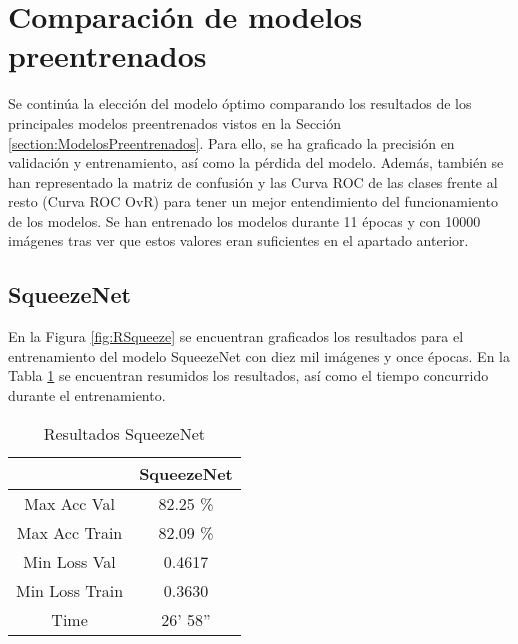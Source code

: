 \documentclass{report}
\begin{document}
\newpage
\section{Comparación de modelos preentrenados}



Se continúa la elección del modelo óptimo comparando los resultados de los principales modelos preentrenados vistos en la Sección \ref{section:ModelosPreentrenados}. Para ello, se ha graficado la precisión en validación y entrenamiento, así como la pérdida del modelo. Además, también se han representado la matriz de confusión y las Curva ROC de las clases frente al resto (Curva ROC OvR) para tener un mejor entendimiento del funcionamiento de los modelos. Se han entrenado los modelos durante 11 épocas y con 10000 imágenes tras ver que estos valores eran suficientes en el apartado anterior.




\subsection{SqueezeNet}

En la Figura \ref{fig:RSqueeze} se encuentran graficados los resultados para el entrenamiento del modelo SqueezeNet con diez mil imágenes y once épocas. En la Tabla \ref{tab:RSqueeze} se encuentran resumidos los resultados, así como el tiempo concurrido durante el entrenamiento.


\begin{table}[H]
\centering
\begin{tabular}{|c|c|}
\hline
\cellcolor[HTML]{FFFFFF}{\color[HTML]{000000} Modelo} & SqueezeNet \\ \hline
Max Acc Val                                           &  82.25 \%       \\ \hline
Max Acc Train                                         &  82.09 \%      \\ \hline
Min Loss Val                                          &  0.4617     \\ \hline
Min Loss Train                                        &  0.3630    \\ \hline
Time                                                  &  26' 58''   \\ \hline
\end{tabular}
\caption{Resultados SqueezeNet}
\label{tab:RSqueeze}
\end{table}
\end{document}
